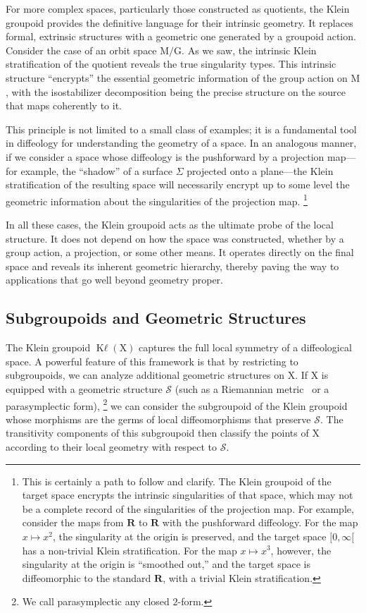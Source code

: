 \documentclass[10pt,reqno,letterpaper,twoside]{amsart}
\theoremstyle{article}
\newcommand{\RR}{\mathbf{R}}
\newcommand{\cS}{{\mathcal S}}
\def \G{\mathrm G}
\def \K{\mathrm K}
\def \M{\mathrm M}
\def \X{\mathrm X}
\DeclareMathOperator{\Kl}{{\K\ell}}
\begin{document}
  For more complex spaces,
  particularly those constructed as quotients,
  the Klein groupoid provides the definitive language for their intrinsic geometry.
  It replaces formal,
  extrinsic structures with a geometric one generated by a groupoid action.
  Consider the case of an orbit space $\M/\G$.
  As we saw,
  the intrinsic Klein stratification of the quotient reveals the true singularity types.
  This intrinsic structure ``encrypts'' the essential geometric information of the group action on $\M$,
  with the isostabilizer decomposition being the precise structure on the source that maps coherently to it.
  
  This principle is not limited to a small class of examples;
  it is a fundamental tool in diffeology for understanding the geometry of a space.
  In an analogous manner,
  if we consider a space whose diffeology is the pushforward by a projection map—for example,
  the ``shadow'' of a surface $\Sigma$ projected onto a plane—the Klein stratification of the resulting space will necessarily encrypt up to some level the geometric information about the singularities of the projection map.%
  \footnote{This is certainly a path to follow and clarify.
  The Klein groupoid of the target space encrypts the intrinsic singularities of that space,
  which may not be a complete record of the singularities of the projection map.
  For example,
  consider the maps from $\RR$ to $\RR$ with the pushforward diffeology.
  For the map $x \mapsto x^2$,
  the singularity at the origin is preserved,
  and the target space $[0,\infty[$ has a non-trivial Klein stratification.
  For the map $x \mapsto x^3$,
  however,
  the singularity at the origin is ``smoothed out,''
  and the target space is diffeomorphic to the standard $\RR$,
  with a trivial Klein stratification.}
  
  In all these cases,
  the Klein groupoid acts as the ultimate probe of the local structure.
  It does not depend on how the space was constructed,
  whether by a group action, a projection, or some other means.
  It operates directly on the final space and reveals its inherent geometric hierarchy,
  thereby paving the way to applications that
  go well beyond geometry proper.
  \subsection{Subgroupoids and Geometric Structures}
  
  The Klein groupoid $\Kl(\X)$ captures the full local symmetry of a diffeological space.
  A powerful feature of this framework is that by restricting to subgroupoids, we can analyze additional geometric structures on $\X$.
  If $\X$ is equipped with a geometric structure $\cS$ (such as a Riemannian metric~\cite[p.224]{PIZ25a} or a parasymplectic form),%
  \footnote{We call parasymplectic any closed $2$-form.}
  we can consider the subgroupoid of the Klein groupoid whose morphisms are the germs of local diffeomorphisms that preserve $\cS$.
  The transitivity components of this subgroupoid then classify the points of $\X$ according to their local geometry with respect to $\cS$.
  
\end{document}
